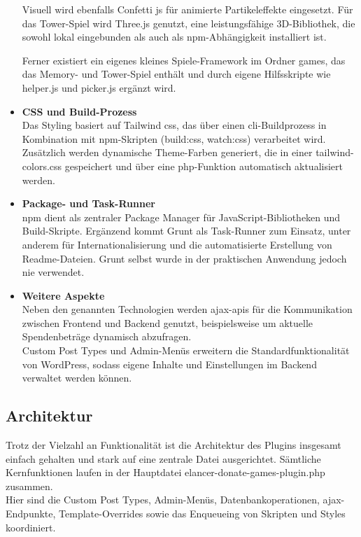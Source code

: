 \begin{itemize}
    Visuell wird ebenfalls Confetti \gls{js} für animierte Partikeleffekte eingesetzt.
    Für das Tower-Spiel wird Three.js genutzt, eine leistungsfähige 3D-Bibliothek, die sowohl lokal eingebunden als auch als \gls{npm}-Abhängigkeit installiert ist.

    Ferner existiert ein eigenes kleines Spiele-Framework im Ordner \grqq{}games\grqq{}, das das Memory- und Tower-Spiel enthält und durch eigene Hilfsskripte wie helper.js und picker.js ergänzt wird.

    \item \textbf{CSS und Build-Prozess}\\
    Das Styling basiert auf Tailwind \gls{css}, das über einen \gls{cli}-Buildprozess in Kombination mit npm-Skripten (build:css, watch:css) verarbeitet wird.
    Zusätzlich werden dynamische Theme-Farben generiert, die in einer tailwind-colors.css gespeichert und über eine \gls{php}-Funktion automatisch aktualisiert werden.

    \item \textbf{Package- und Task-Runner}\\
    \gls{npm} dient als zentraler Package Manager für JavaScript-Bibliotheken und Build-Skripte.
    Ergänzend kommt Grunt als Task-Runner zum Einsatz, unter anderem für Internationalisierung und die automatisierte Erstellung von Readme-Dateien.
    Grunt selbst wurde in der praktischen Anwendung jedoch nie verwendet.

    \item \textbf{Weitere Aspekte}\\
    Neben den genannten Technologien werden \gls{ajax}-\gls{api}s für die Kommunikation zwischen Frontend und Backend genutzt, beispielsweise um aktuelle Spendenbeträge dynamisch abzufragen.\\
    Custom Post Types und Admin-Menüs erweitern die Standardfunktionalität von WordPress, sodass eigene Inhalte und Einstellungen im Backend verwaltet werden können.
\end{itemize}
\subsection{Architektur}

Trotz der Vielzahl an Funktionalität ist die Architektur des Plugins insgesamt einfach gehalten und stark auf eine zentrale Datei ausgerichtet.
Sämtliche Kernfunktionen laufen in der Hauptdatei elancer-donate-games-plugin.php zusammen.\\
Hier sind die Custom Post Types, Admin-Menüs, Datenbankoperationen, \gls{ajax}-Endpunkte, Template-Overrides sowie das Enqueueing von Skripten und Styles koordiniert.

